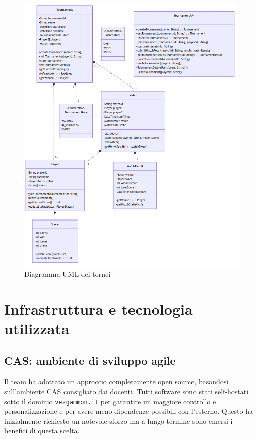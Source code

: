 \documentclass{article}
\begin{document}
\begin{figure}[H]
    \centering
    \includegraphics[width=12cm]{uml-tournaments}
    \caption{Diagramma UML dei tornei}
    \label{fig:tournaments}
\end{figure}

\section{Infrastruttura e tecnologia utilizzata}

\subsection{CAS: ambiente di sviluppo agile}

Il team ha adottato un approccio completamente open source, basandosi sull'ambiente CAS consigliato dai docenti. 
Tutti software sono stati self-hostati sotto il dominio \href{https://vezgammon.it}{\texttt{vezgammon.it}} per garantire 
un maggiore controllo e personalizzazione e per avere meno dipendenze possibili con l'esterno. Questo ha inizialmente richiesto 
un notevole sforzo ma a lungo termine sono emersi i benefici di questa scelta.
\end{document}
